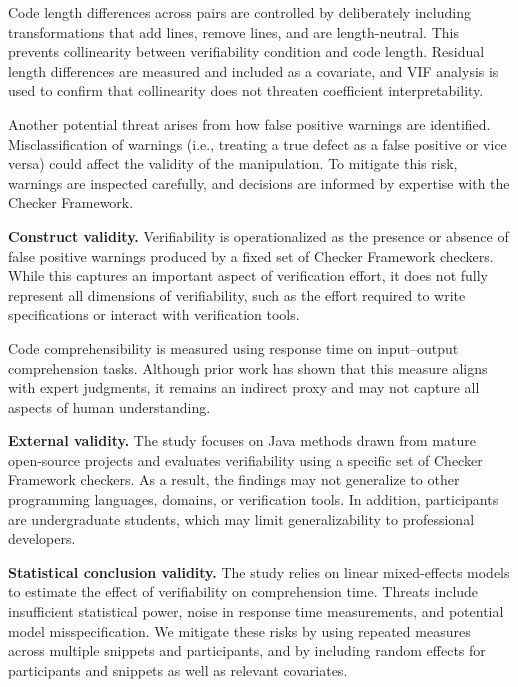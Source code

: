 Code length differences across pairs are controlled by deliberately including transformations that add lines, remove lines, and are length-neutral. This prevents collinearity between verifiability condition and code length. Residual length differences are measured and included as a covariate, and VIF analysis is used to confirm that collinearity does not threaten coefficient interpretability.

Another potential threat arises from how false positive warnings are identified. Misclassification of warnings (i.e., treating a true defect as a false positive or vice versa) could affect the validity of the manipulation. To mitigate this risk, warnings are inspected carefully, and decisions are informed by expertise with the Checker Framework.

\textbf{Construct validity.}
Verifiability is operationalized as the presence or absence of false positive warnings produced by a fixed set of Checker Framework checkers. While this captures an important aspect of verification effort, it does not fully represent all dimensions of verifiability, such as the effort required to write specifications or interact with verification tools.

Code comprehensibility is measured using response time on input--output comprehension tasks. Although prior work has shown that this measure aligns with expert judgments, it remains an indirect proxy and may not capture all aspects of human understanding.

\textbf{External validity.}
The study focuses on Java methods drawn from mature open-source projects and evaluates verifiability using a specific set of Checker Framework checkers. As a result, the findings may not generalize to other programming languages, domains, or verification tools. In addition, participants are undergraduate students, which may limit generalizability to professional developers.

\textbf{Statistical conclusion validity.}
The study relies on linear mixed-effects models to estimate the effect of verifiability on comprehension time. Threats include insufficient statistical power, noise in response time measurements, and potential model misspecification. We mitigate these risks by using repeated measures across multiple snippets and participants, and by including random effects for participants and snippets as well as relevant covariates.